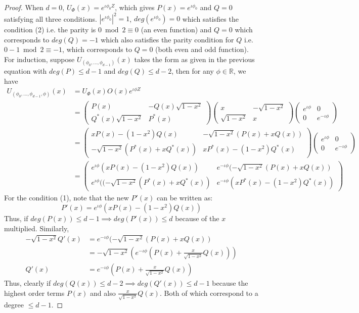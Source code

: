 \documentclass[12pt, oneside]{book}
\theoremstyle{definition}
\theoremstyle{definition}
\theoremstyle{remark}
\begin{document}
\begin{proof}
    When $d=0$, $U_{\Phi}(x)=e^{\iota \phi_0Z}$, which gives $P(x)=e^{\iota \phi_0}$ and $Q=0$ satisfying all three conditions. $|e^{\iota\phi_0}|^2=1$, $deg(e^{\iota \phi_0})=0$ which satisfies the condition (2) i.e. the parity is $0\bmod 2\equiv 0$ (an even function) and $Q=0$ which corresponds to $deg(Q)=-1$  which also satisfies the parity condition for $Q$ i.e. $0-1 \bmod 2 \equiv -1$, which corresponds to $Q=0$ (both even and odd function). For induction, suppose $U_{(\phi_0,\ldots,\phi_{d-1})}(x)$ takes the form as given in the previous equation with $deg(P)\leq d-1$ and $deg(Q)\leq d-2$, then for any $\phi \in \mathbb{R}$, we have
    \begin{align*}
    U_{(\phi_0,\ldots,\phi_{d-1},\phi)}(x)&= U_{\Phi}(x)O(x)e^{\iota \phi Z}\\ &= \begin{pmatrix} P(x) & -Q(x)\sqrt{1-x^2} \\ Q^*(x)\sqrt{1-x^2} & P^*(x) \end{pmatrix} \begin{pmatrix} x & -\sqrt{1-x^2} \\ \sqrt{1-x^2} & x \end{pmatrix} \begin{pmatrix} e^{\iota \phi} & 0 \\ 0 & e^{-\iota \phi} \end{pmatrix}\\
    &=\begin{pmatrix} xP(x)-(1-x^2)Q(x) & -\sqrt{1-x^2}(P(x)+xQ(x)) \\ -\sqrt{1-x^2}(P^*(x)+xQ^*(x)) & xP^*(x)-(1-x^2)Q^*(x) \end{pmatrix}\begin{pmatrix} e^{\iota \phi} & 0 \\ 0 & e^{-\iota \phi} \end{pmatrix}\\
    &= \begin{pmatrix} e^{\iota \phi}(xP(x) - (1-x^2)Q(x)) & e^{-\iota \phi}(-\sqrt{1-x^2}(P(x)+xQ(x))\\ e^{\iota \phi}((-\sqrt{1-x^2}(P^*(x)+xQ^*(x)) & e^{-\iota \phi}(xP^*(x) - (1-x^2)Q^*(x)) \end{pmatrix}
    \end{align*}
    For the condition (1), note that the new $P'(x)$ can be written as:
    \[
    P'(x) = e^{\iota \phi}(xP(x)-(1-x^2)Q(x))
    \]
    Thus, if $deg(P(x))\leq d-1 \implies deg(P'(x))\leq d$ because of the $x$ multiplied. Similarly,
    \begin{align*}
    -\sqrt{1-x^2}Q'(x) &= e^{-\iota \phi}(-\sqrt{1-x^2}(P(x)+xQ(x))\\
    &=-\sqrt{1-x^2}\left(e^{-\iota \phi}\left(P(x)+\frac{x}{\sqrt{1-x^2}}Q(x)\right)\right)\\
    Q'(x) &= e^{-\iota \phi}\left(P(x) + \frac{x}{\sqrt{1-x^2}}Q(x)\right)
    \end{align*}
    Thus, clearly if $deg(Q(x))\leq d-2 \implies deg(Q'(x))\leq d-1$ because the highest order terms $P(x)$ and also $\frac{x}{\sqrt{1-x^2}}Q(x)$. Both of which correspond to a degree $\leq d-1$.


\end{proof}
\end{document}
